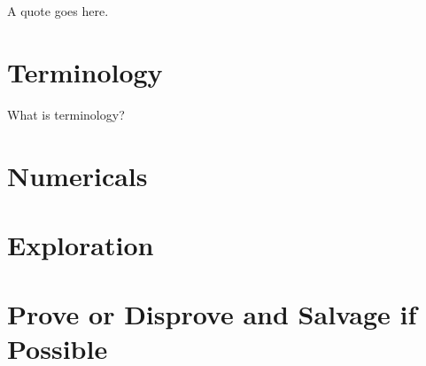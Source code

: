 \documentclass{homework}
\author{Jim Fowler}
\begin{document}
\maketitle

\begin{inspiration}
A quote goes here.
\end{inspiration}

\section{Terminology}

\begin{problem}
  What is terminology?
\end{problem}

\section{Numericals}

\section{Exploration}

\section{Prove or Disprove and Salvage if Possible}
\end{document}
